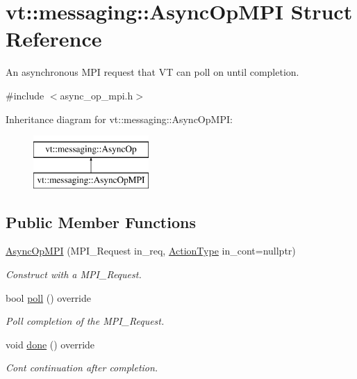 \hypertarget{structvt_1_1messaging_1_1_async_op_m_p_i}{}\section{vt\+:\+:messaging\+:\+:Async\+Op\+M\+PI Struct Reference}
\label{structvt_1_1messaging_1_1_async_op_m_p_i}


An asynchronous M\+PI request that VT can poll on until completion.  




{\ttfamily \#include $<$async\+\_\+op\+\_\+mpi.\+h$>$}

Inheritance diagram for vt\+:\+:messaging\+:\+:Async\+Op\+M\+PI\+:\begin{figure}[H]
\begin{center}
\leavevmode
\includegraphics[height=2.000000cm]{structvt_1_1messaging_1_1_async_op_m_p_i}
\end{center}
\end{figure}
\subsection*{Public Member Functions}
\begin{DoxyCompactItemize}
\item 
\hyperlink{structvt_1_1messaging_1_1_async_op_m_p_i_ac4378764f3662f86a5ef4fe3822a9e47}{Async\+Op\+M\+PI} (M\+P\+I\+\_\+\+Request in\+\_\+req, \hyperlink{namespacevt_ae0a5a7b18cc99d7b732cb4d44f46b0f3}{Action\+Type} in\+\_\+cont=nullptr)
\begin{DoxyCompactList}\small\item\em Construct with a {\ttfamily M\+P\+I\+\_\+\+Request}. \end{DoxyCompactList}\item 
bool \hyperlink{structvt_1_1messaging_1_1_async_op_m_p_i_ab61e79fdd10f5345d5a6fa367267f7f4}{poll} () override
\begin{DoxyCompactList}\small\item\em Poll completion of the {\ttfamily M\+P\+I\+\_\+\+Request}. \end{DoxyCompactList}\item 
void \hyperlink{structvt_1_1messaging_1_1_async_op_m_p_i_ab4777982f1e845811a2df08ffd3509f0}{done} () override
\begin{DoxyCompactList}\small\item\em Cont continuation after completion. \end{DoxyCompactList}\end{DoxyCompactItemize}
